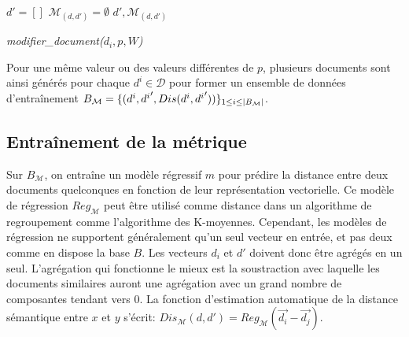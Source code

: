 \begin{algorithm}[!htb] %
 ${d'} = [] $\; 
 $\mathcal{M}_{(d,d')} = \emptyset$\;
 \Return $d', \mathcal{M}_{(d,d')}$\;
 \caption{\textit{modifier\_document($d_i, p, W$)}} \label{algo:similarite:modifierdoc}
\end{algorithm}

Pour une même valeur ou des valeurs différentes de $p$, plusieurs documents sont ainsi générés pour chaque $d^i \in \mathcal{D}$ pour former un ensemble de données d'entraînement $B_\mathcal{M} = \lbrace (d^i, {d^i}', {Dis}(d^i, {d^i}'))\rbrace_{1 \leq i \leq {\vert B_\mathcal{M}\vert}}$.

\subsection{Entraînement de la métrique}

Sur $B_\mathcal{M}$, on entraîne un modèle régressif $m$ pour prédire la distance entre deux documents quelconques en fonction de leur représentation vectorielle. Ce modèle de régression $Reg_\mathcal{M}$ peut être utilisé comme distance dans un algorithme de regroupement comme l'algorithme des K-moyennes. Cependant, les modèles de régression ne supportent généralement qu'un seul vecteur en entrée, et pas deux comme en dispose la base $B$. Les vecteurs $d_i$ et $d'$ doivent donc être agrégés en un seul. L'agrégation qui fonctionne le mieux est la soustraction avec laquelle les documents similaires auront une agrégation avec un grand nombre de composantes tendant vers 0. La fonction d'estimation automatique de la distance sémantique entre $x$ et $y$ s'écrit: $Dis_\mathcal{M}(d, d') = Reg_\mathcal{M}(\vec{d_{i}} - \vec{d_{j}})$. 

